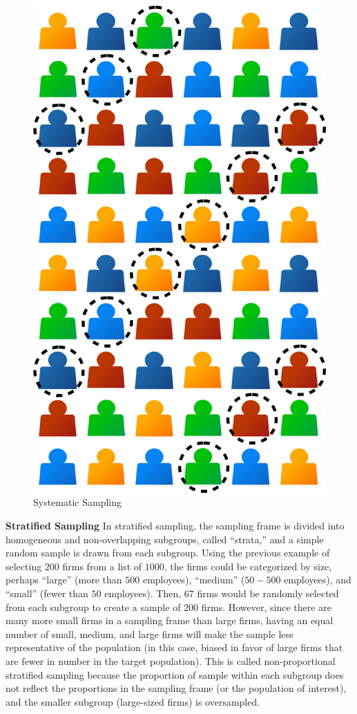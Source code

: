 \begin{figure}[H]
	\centering
	\includegraphics[width=\maxwidth{.35\linewidth}]{gfx/07-03}
	\caption{Systematic Sampling}
	\label{07:fig03}
\end{figure}

\textbf{Stratified Sampling} In stratified sampling, the sampling frame is divided into homogeneous and non-overlapping subgroups, called ``strata,'' and a simple random sample is drawn from each subgroup. Using the previous example of selecting $ 200 $ firms from a list of $ 1000 $, the firms could be categorized by size, perhaps ``large'' (more than $ 500 $ employees), ``medium'' ($ 50 - 500 $ employees), and ``small'' (fewer than $ 50 $ employees). Then, $ 67 $ firms would be randomly selected from each subgroup to create a sample of $ 200 $ firms. However, since there are many more small firms in a sampling frame than large firms, having an equal number of small, medium, and large firms will make the sample less representative of the population (in this case, biased in favor of large firms that are fewer in number in the target population). This is called non-proportional stratified sampling because the proportion of sample within each subgroup does not reflect the proportions in the sampling frame (or the population of interest), and the smaller subgroup (large-sized firms) is oversampled. 
	
